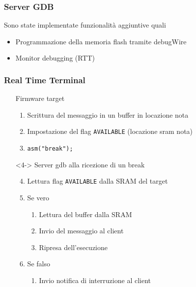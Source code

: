 \documentclass[aspectratio=169,
]{beamer}
\begin{document}
    \begin{frame}
        \frametitle{Server GDB}
        
        Sono state implementate funzionalità aggiuntive quali
        \begin{itemize}
            \item <1-> Programmazione della memoria flash tramite debugWire
            \item <2-> Monitor debugging (RTT)
        \end{itemize}
    
    \end{frame}

    \begin{frame}
        \frametitle{Real Time Terminal}
        \hspace*{-10mm}\begin{minipage}{.7\textwidth}
            \begin{itemize}
                \item[] Firmware target
                \begin{enumerate}
                    \item <1-> Scrittura del messaggio in un buffer in locazione nota
                    \item <2-> Impostazione del flag \texttt{AVAILABLE} (locazione sram nota)
                    \item <3-> \texttt{asm("break");}
                \end{enumerate}
                \item[] <4-> Server gdb alla ricezione di un break
                \begin{enumerate}
                    \setcounter{enumi}{3}
                    \item <4-> Lettura flag \texttt{AVAILABLE} dalla SRAM del target
                    \item <5-> Se vero
                    \begin{enumerate}
                        \item <5-> Lettura del buffer dalla SRAM
                        \item <5-> Invio del messaggio al client
                        \item <5-> Ripresa dell'esecuzione
                    \end{enumerate}
                    \item <6-> Se falso
                    \begin{enumerate}
                        \item <6-> Invio notifica di interruzione al client
                    \end{enumerate}
                \end{enumerate}
            \end{itemize}     
        \end{minipage}
        \begin{minipage}{.28\textwidth}
            \begin{figure}
                \begin{tikzpicture}[scale=.8, label distance=-2mm]


\end{tikzpicture}
\end{figure}
\end{minipage}
\end{frame}
\end{document}
